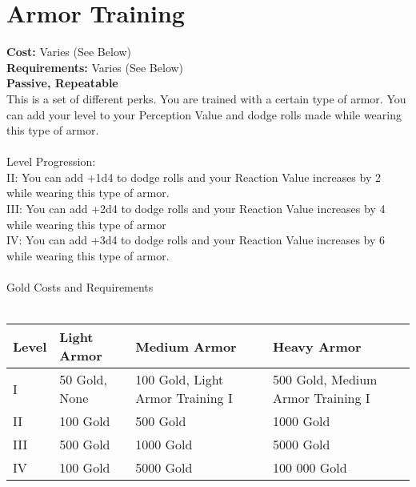 \section{Armor Training}
\textbf{Cost:} Varies (See Below)\\
\textbf{Requirements:} Varies (See Below)\\
\textbf{Passive, Repeatable}\\
This is a set of different perks. You are trained with a certain type of armor. You can add your level to your Perception Value and dodge rolls made while wearing this type of armor.\\
\\
Level Progression:\\
II: You can add +1d4 to dodge rolls and your Reaction Value increases by 2 while wearing this type of armor.\\
III: You can add +2d4 to dodge rolls and your Reaction Value increases by 4 while wearing this type of armor\\
IV: You can add +3d4 to dodge rolls and your Reaction Value increases by 6 while wearing this type of armor.\\
\\
Gold Costs and Requirements\\
\\
\begin{tabular}{l | p{3.25cm} | p{3.25cm} | p{3.25cm}}
	Level & Light Armor & Medium Armor & Heavy Armor\\ \hline
	I & 50 Gold, None & 100 Gold, Light Armor Training I & 500 Gold, Medium Armor Training I\\
	II & 100 Gold & 500 Gold & 1000 Gold\\
	III & 500 Gold & 1000 Gold & 5000 Gold\\
	IV & 100 Gold & 5000 Gold & 100 000 Gold\\
\end{tabular}
